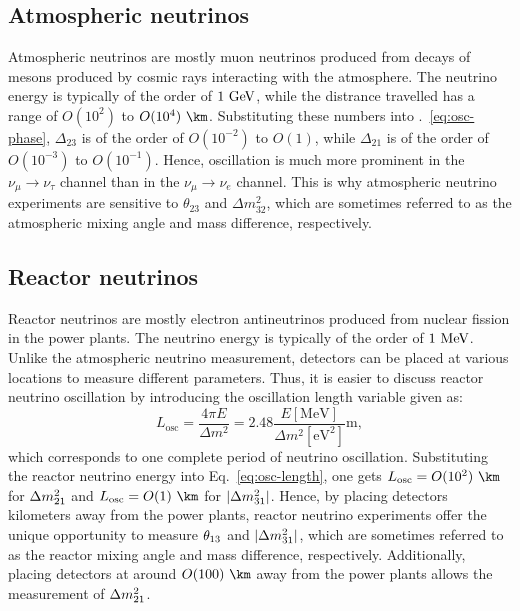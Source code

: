 \subsection{Atmospheric neutrinos}
  Atmospheric neutrinos are mostly muon neutrinos produced from decays of mesons produced by cosmic rays interacting with the atmosphere.
  The neutrino energy is typically of the order of $1~\textrm{GeV}$, while the distrance travelled has a range of $O(10^2)$ to $O(10^4)~\km$.
  Substituting these numbers into \Eq.~\ref{eq:osc-phase}, $\Delta_{23}$ is of the order of $O(10^{-2})$ to $O(1)$, while $\Delta_{21}$ is of the order of $O(10^{-3})$ to $O(10^{-1})$.
  Hence, oscillation is much more prominent in the $\nu_\mu \to \nu_\tau$ channel than in the $\nu_\mu \to \nu_e$ channel.
  This is why atmospheric neutrino experiments are sensitive to $\theta_{23}$ and $\Delta m^2_{32}$, which are sometimes referred to as the atmospheric mixing angle and mass difference, respectively.

\subsection{Reactor neutrinos}
  Reactor neutrinos are mostly electron antineutrinos produced from nuclear fission in the power plants.
  The neutrino energy is typically of the order of $1~\textrm{MeV}$.
  Unlike the atmospheric neutrino measurement, detectors can be placed at various locations to measure different parameters.
  Thus, it is easier to discuss reactor neutrino oscillation by introducing the oscillation length variable given as:
  \begin{equation}
    \label{eq:osc-length}
    L_{\text{osc}} = \frac{4\pi E}{\Delta m^2} = 2.48 \frac{E [\text{MeV}]}{\Delta m^2 [\text{eV}^2]} \text{m},
  \end{equation}
  which corresponds to one complete period of neutrino oscillation.
  Substituting the reactor neutrino energy into Eq.~\ref{eq:osc-length}, one gets $L_{\text{osc}} = O(10^2)~\km$ for $\Delta m^2_{21}$ and $L_{\text{osc}} = O(1)~\km$ for $|\Delta m^2_{31}|$. 
  Hence, by placing detectors kilometers away from the power plants, reactor neutrino experiments offer the unique opportunity to measure $\theta_{13}$ and $|\Delta m^2_{31}|$, which are sometimes referred to as the reactor mixing angle and mass difference, respectively.
  Additionally, placing detectors at around $O(100)~\km$ away from the power plants allows the measurement of $\Delta m^2_{21}$.

